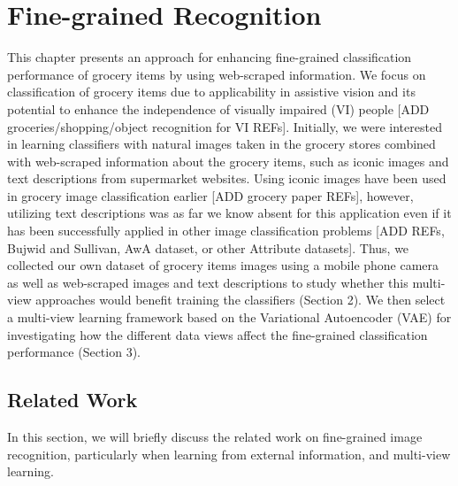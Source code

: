 
\chapter{Fine-grained Recognition}
\label{chap:finegrained_classification}


This chapter presents an approach for enhancing fine-grained classification performance of grocery items by using web-scraped information. We focus on classification of grocery items due to applicability in assistive vision and its potential to enhance the independence of visually impaired (VI) people [ADD groceries/shopping/object recognition for VI REFs]. Initially, we were interested in learning classifiers with natural images taken in the grocery stores combined with web-scraped information about the grocery items, such as iconic images and text descriptions from supermarket websites. Using iconic images have been used in grocery image classification earlier [ADD grocery paper REFs], however, utilizing text descriptions was as far we know absent for this application even if it has been successfully applied in other image classification problems [ADD REFs, Bujwid and Sullivan, AwA dataset, or other Attribute datasets]. Thus, we collected our own dataset of grocery items images using a mobile phone camera as well as web-scraped images and text descriptions to study whether this multi-view approaches would benefit training the classifiers (Section 2). We then select a multi-view learning framework based on the Variational Autoencoder (VAE) for investigating how the different data views affect the fine-grained classification performance (Section 3). 

\section{Related Work}

In this section, we will briefly discuss the related work on fine-grained image recognition, particularly when learning from external information, and multi-view learning. 

